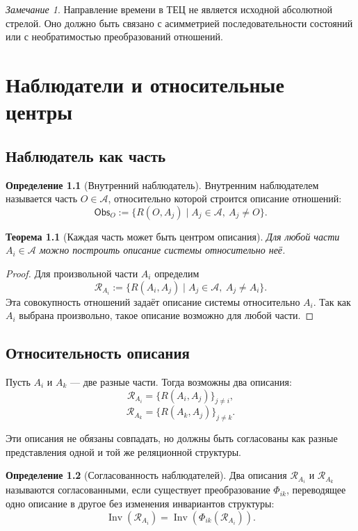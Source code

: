 \documentclass[12pt,a4paper,oneside]{book}
\theoremstyle{definition}
\newtheorem{definition}{Определение}[chapter]
\theoremstyle{plain}
\newtheorem{theorem}{Теорема}[chapter]
\theoremstyle{remark}
\newtheorem{remark}{Замечание}[chapter]
\newcommand{\Parts}{\mathcal A}
\newcommand{\Rel}{R}
\newcommand{\Observer}{\mathsf{Obs}}
\newcommand{\Inv}{\operatorname{Inv}}
\begin{document}
\begin{remark}
Направление времени в ТЕЦ не является исходной абсолютной стрелой. Оно должно быть связано с асимметрией последовательности состояний или с необратимостью преобразований отношений.
\end{remark}

\chapter{Наблюдатели и относительные центры}

\section{Наблюдатель как часть}

\begin{definition}[Внутренний наблюдатель]
Внутренним наблюдателем называется часть \(O\in\Parts\), относительно которой строится описание отношений:
\[
\Observer_O:=\{\Rel(O,A_j)\mid A_j\in\Parts,\ A_j\neq O\}.
\]
\end{definition}

\begin{theorem}[Каждая часть может быть центром описания]
Для любой части \(A_i\in\Parts\) можно построить описание системы относительно неё.
\end{theorem}

\begin{proof}
Для произвольной части \(A_i\) определим
\[
\mathcal R_{A_i}:=\{\Rel(A_i,A_j)\mid A_j\in\Parts,\ A_j\neq A_i\}.
\]
Эта совокупность отношений задаёт описание системы относительно \(A_i\). Так как \(A_i\) выбрана произвольно, такое описание возможно для любой части.
\end{proof}

\section{Относительность описания}

Пусть \(A_i\) и \(A_k\) --- две разные части. Тогда возможны два описания:
\[
\mathcal R_{A_i}=\{\Rel(A_i,A_j)\}_{j\neq i},
\]
\[
\mathcal R_{A_k}=\{\Rel(A_k,A_j)\}_{j\neq k}.
\]

Эти описания не обязаны совпадать, но должны быть согласованы как разные представления одной и той же реляционной структуры.

\begin{definition}[Согласованность наблюдателей]
Два описания \(\mathcal R_{A_i}\) и \(\mathcal R_{A_k}\) называются согласованными, если существует преобразование \(\Phi_{ik}\), переводящее одно описание в другое без изменения инвариантов структуры:
\[
\Inv(\mathcal R_{A_i})=\Inv(\Phi_{ik}(\mathcal R_{A_i})).
\]
\end{definition}
\end{document}
